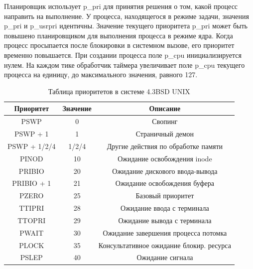 \documentclass[a4paper,oneside,14pt]{extarticle}
\begin{document}
Планировщик использует p\_pri для принятия решения о том, какой процесс направить на выполнение.
У процесса, находящегося в режиме задачи, значения p\_pri и p\_usrpri идентичны.
Значение текущего приоритета p\_pri может быть повышено планировщиком для выполнения процесса в режиме ядра.
Когда процесс просыпается после блокировки в системном вызове, его приоритет временно повышается.
При создании процесса поле p\_cpu инициализируется нулем.
На каждом тике обработчик таймера увеличивает поле p\_cpu текущего процесса на единицу, до максимального значения, равного 127.

\begin{table}[h]
    \caption{Таблица приоритетов в системе 4.3BSD UNIX}
	\label{tab:bsd}
	\begin{center}
		\begin{tabular}{ |c|c|c|  }
			\hline
			{Приоритет} & {Значение} & {Описание} \\
			\hline
			{PSWP} & 0 & Свопинг \\
			\hline
			{PSWP + 1} & 1 & Страничный демон \\
			\hline
			{PSWP + 1/2/4} & 1/2/4 & Другие действия по обработке памяти \\
			\hline
			{PINOD} & 10 & Ожидание освобождения inode \\
			\hline
			{PRIBIO} & 20 & Ожидание дискового ввода-вывода \\
			\hline
			{PRIBIO + 1} & 21 & Ожидание освобождения буфера \\
			\hline
			{PZERO} & 25 & Базовый приоритет \\
			\hline
			{TTIPRI} & 28 & Ожидание ввода с терминала \\
			\hline
			{TTOPRI} & 29 & Ожидание вывода с терминала \\
			\hline 
			{PWAIT} & 30 & Ожидание завершения процесса потомка \\
			\hline
			{PLOCK} & 35 & Консультативное ожидание блокир. ресурса \\
			\hline
			{PSLEP} & 40 & Ожидание сигнала \\
			\hline
		\end{tabular}
	\end{center}
\end{table}
\end{document}

